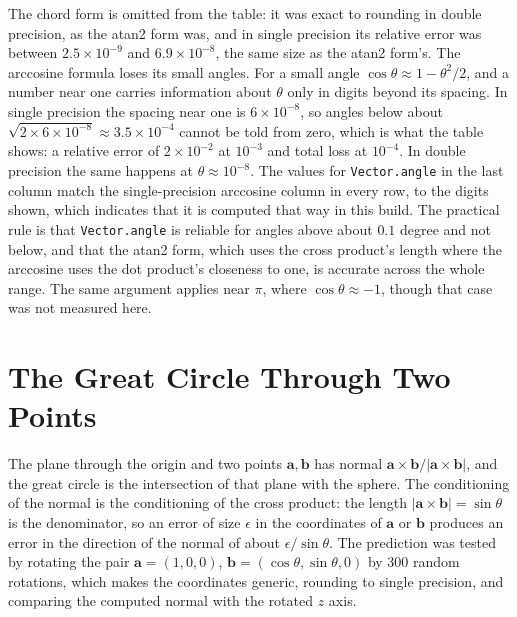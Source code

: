 The chord form is omitted from the table: it was exact to rounding in double precision, as the atan2 form was, and in single precision its relative error was between $2.5\times10^{-9}$ and $6.9\times10^{-8}$, the same size as the atan2 form's. The arccosine formula loses its small angles. For a small angle $\cos\theta\approx1-\theta^2/2$, and a number near one carries information about $\theta$ only in digits beyond its spacing. In single precision the spacing near one is $6\times10^{-8}$, so angles below about $\sqrt{2\times6\times10^{-8}}\approx3.5\times10^{-4}$ cannot be told from zero, which is what the table shows: a relative error of $2\times10^{-2}$ at $10^{-3}$ and total loss at $10^{-4}$. In double precision the same happens at $\theta\approx10^{-8}$. The values for \texttt{Vector.angle} in the last column match the single-precision arccosine column in every row, to the digits shown, which indicates that it is computed that way in this build. The practical rule is that \texttt{Vector.angle} is reliable for angles above about $0.1$ degree and not below, and that the atan2 form, which uses the cross product's length where the arccosine uses the dot product's closeness to one, is accurate across the whole range. The same argument applies near $\pi$, where $\cos\theta\approx-1$, though that case was not measured here.

\section{The Great Circle Through Two Points}

The plane through the origin and two points $\mathbf a,\mathbf b$ has normal $\mathbf a\times\mathbf b/|\mathbf a\times\mathbf b|$, and the great circle is the intersection of that plane with the sphere. The conditioning of the normal is the conditioning of the cross product: the length $|\mathbf a\times\mathbf b|=\sin\theta$ is the denominator, so an error of size $\epsilon$ in the coordinates of $\mathbf a$ or $\mathbf b$ produces an error in the direction of the normal of about $\epsilon/\sin\theta$. The prediction was tested by rotating the pair $\mathbf a=(1,0,0)$, $\mathbf b=(\cos\theta,\sin\theta,0)$ by $300$ random rotations, which makes the coordinates generic, rounding to single precision, and comparing the computed normal with the rotated $z$ axis.


